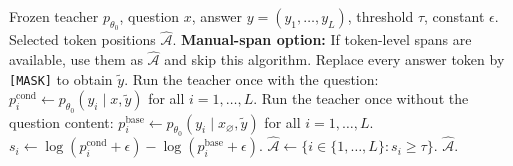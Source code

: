 \documentclass{article}
\newcommand{\Ahat}{\widehat{\mathcal A}}
\begin{document}
\begin{algorithm}[h]
\caption{Optional single-score selection of forget-token positions}
\label{alg:selection}
\begin{algorithmic}[1]
\Require Frozen teacher $p_{\theta_0}$, question $x$, answer $y=(y_1,\ldots,y_L)$, threshold $\tau$, constant $\epsilon$.
\Ensure Selected token positions $\Ahat$.
\Statex \textbf{Manual-span option:} If token-level spans are available, use them as $\Ahat$ and skip this algorithm.
\State Replace every answer token by \texttt{[MASK]} to obtain $\widetilde y$.
\State Run the teacher once with the question:
\Statex \hspace{1.5em}$p_i^{\mathrm{cond}} \gets p_{\theta_0}(y_i\mid x,\widetilde y)$ for all $i=1,\ldots,L$.
\State Run the teacher once without the question content:
\Statex \hspace{1.5em}$p_i^{\mathrm{base}} \gets p_{\theta_0}(y_i\mid x_{\varnothing},\widetilde y)$ for all $i=1,\ldots,L$.
    \State $s_i \gets \log(p_i^{\mathrm{cond}}+\epsilon)-\log(p_i^{\mathrm{base}}+\epsilon)$.
\EndFor
\State $\Ahat \gets \{i\in\{1,\ldots,L\}:s_i\geq\tau\}$.
\State \Return $\Ahat$.
\end{algorithmic}
\end{algorithm}
\end{document}
